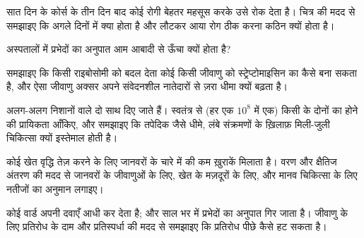 \begin{exercise}[$\star\star$]\label{exo:g11:antibiotic-resistance:9}
सात दिन के कोर्स के तीन दिन बाद कोई रोगी बेहतर महसूस करके उसे रोक देता है।
चित्र की मदद से समझाइए कि अगले दिनों में क्या होता है और लौटकर आया रोग
ठीक करना कठिन क्यों होता है।
\end{exercise}

\begin{exercise}[$\star\star$]\label{exo:g11:antibiotic-resistance:10}
अस्पतालों में  प्रभेदों का अनुपात आम आबादी से ऊँचा क्यों होता है?
\end{exercise}

\begin{exercise}[$\star\star$]\label{exo:g11:antibiotic-resistance:11}
समझाइए कि किसी राइबोसोमी  को बदल देता कोई  किसी जीवाणु
को स्ट्रेप्टोमाइसिन का  कैसे बना सकता है, और ऐसा जीवाणु अक्सर
अपने संवेदनशील नातेदारों से ज़रा धीमा क्यों बढ़ता है।
\end{exercise}

\begin{exercise}[$\star\star\star$]\label{exo:g11:antibiotic-resistance:12}
अलग-अलग निशानों वाले दो  साथ दिए जाते हैं। स्वतंत्र
 से (हर एक $10^8$ में एक) किसी  के दोनों का 
होने की प्रायिकता आँकिए, और समझाइए कि तपेदिक जैसे धीमे, लंबे संक्रमणों के
ख़िलाफ़ मिली-जुली चिकित्सा क्यों इस्तेमाल होती है।
\end{exercise}

\begin{exercise}[$\star\star\star$]\label{exo:g11:antibiotic-resistance:13}
कोई खेत वृद्धि तेज़ करने के लिए जानवरों के चारे में  की कम
ख़ुराकें मिलाता है। वरण और क्षैतिज अंतरण की मदद से जानवरों के जीवाणुओं के
लिए, खेत के मज़दूरों के लिए, और मानव चिकित्सा के लिए नतीजों का अनुमान
लगाइए।
\end{exercise}

\begin{exercise}[$\star\star\star$]\label{exo:g11:antibiotic-resistance:14}
कोई वार्ड अपनी  दवाएँ आधी कर देता है; और साल भर में 
प्रभेदों का अनुपात गिर जाता है। जीवाणु के लिए प्रतिरोध के दाम और
प्रतिस्पर्धा की मदद से समझाइए कि प्रतिरोध पीछे कैसे हट सकता है।
\end{exercise}

